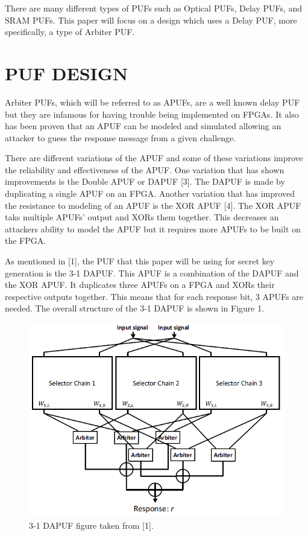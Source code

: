 \documentclass[letterpaper, 10 pt, conference]{ieeeconf}  %
\begin{document}
There are many different types of PUFs such as Optical PUFs, Delay PUFs, and SRAM PUFs.  This paper will focus on a design which uses a Delay PUF, more specifically, a type of Arbiter PUF.

\section{PUF DESIGN}

Arbiter PUFs, which will be referred to as APUFs, are a well known delay PUF but they are infamous for having trouble being implemented on FPGAs.  It also has been proven that an APUF can be modeled and simulated allowing an attacker to guess the response message from a given challenge.

There are different variations of the APUF and some of these variations improve the reliability and effectiveness of the APUF.  One variation that has shown improvements is the Double APUF or DAPUF [3].  The DAPUF is made by duplicating a single APUF on an FPGA.  Another variation that has improved the resistance to modeling of an APUF is the XOR APUF [4].  The XOR APUF taks multiple APUFs' output and XORs them together.  This decreases an attackers ability to model the APUF but it requires more APUFs to be built on the FPGA.

As mentioned in [1], the PUF that this paper will be using for secret key generation is the 3-1 DAPUF.  This APUF is a combination of the DAPUF and the XOR APUF.  It duplicates three APUFs on a FPGA and XORs their respective outputs together.  This means that for each response bit, 3 APUFs are needed.  The overall structure of the 3-1 DAPUF is shown in Figure 1.

\begin{figure}[thpb]
	\centering
	\includegraphics[scale=.50]{DAPUF}
   \caption{3-1 DAPUF figure taken from [1].}
\end{figure}
\end{document}
